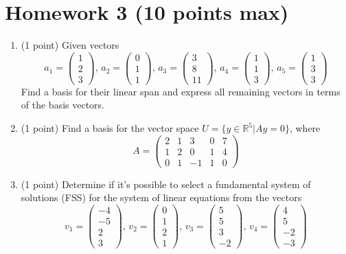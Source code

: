 \documentclass{article}
\begin{document}
\section*{Homework 3 (10 points max)}

\begin{enumerate}
\item (1 point) Given vectors
\[a_1 = \begin{pmatrix}1 \\2 \\3\end{pmatrix},\,a_2 = \begin{pmatrix}0 \\1 \\1\end{pmatrix},\,a_3 = \begin{pmatrix}3 \\8 \\11\end{pmatrix},\,a_4 = \begin{pmatrix}1 \\1 \\3\end{pmatrix},\,a_5 = \begin{pmatrix}1 \\3 \\3\end{pmatrix}\]
Find a basis for their linear span and express all remaining vectors in terms of the basis vectors.

\item (1 point) Find a basis for the vector space $U = \{y \in \mathbb{R}^5| Ay = 0\}$, where
\[
  A = \begin{pmatrix}
    2 & 1 & 3 & 0 & 7 \\
    1 & 2 & 0 & 1 & 4 \\
    0 & 1 & -1 & 1 & 0 
  \end{pmatrix}
\]

\item (1 point) Determine if it's possible to select a fundamental system of solutions (FSS) 
for the system of linear equations from the vectors
\[v_1 = \begin{pmatrix}-4 \\-5 \\2 \\3\end{pmatrix},\,v_2 = \begin{pmatrix}0 \\1 \\2 \\1\end{pmatrix},\,v_3 = \begin{pmatrix}5 \\5 \\3 \\-2\end{pmatrix},\,v_4 = \begin{pmatrix}4 \\5 \\-2 \\-3\end{pmatrix}\]


\end{enumerate}
\end{document}
